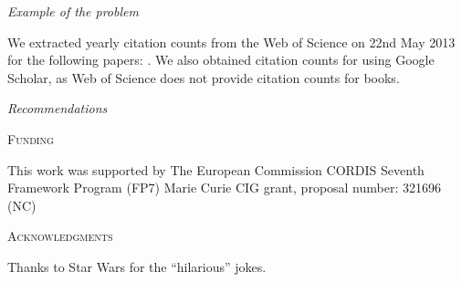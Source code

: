 \documentclass[a4paper,12pt]{article}
\renewcommand{\section}[1]{%
\bigskip
\begin{center}
\begin{Large}
\normalfont\scshape #1
\medskip
\end{Large}
\end{center}}
\renewcommand{\subsection}[1]{%
\bigskip
\begin{center}
\begin{large}
\normalfont\itshape #1
\end{large}
\end{center}}
\begin{document}
\subsection{Example of the problem}

We extracted yearly citation counts from the Web of Science on 22nd May 2013 for the following papers: \citet{diaz1996testing,felsenstein1988phylogenies,felsenstein1985phylogenies,freckleton2000phylogenetic,freckleton2002phylogenetic,freckleton2006detecting,grafen1989phylogenetic,garland1992procedures,hansen1996translating,hansen2005assessing,jones1997optimum,garland2000using,garland1992rate,martins1997phylogenies,price1997correlated,rohle2006comment,ricklefs1996applications,rohlf2001comparative,schluter1997likelihood,westoby1995misinterpreting,westoby1995further}. We also obtained citation counts for \citet{harvey1991comparative} using Google Scholar, as Web of Science does not provide citation counts for books.

\subsection{Recommendations}



\section{Funding}
This work was supported by The European Commission CORDIS Seventh Framework Program (FP7) Marie Curie CIG grant, proposal number: 321696 (NC)

\section{Acknowledgments}
Thanks to Star Wars for the ``hilarious'' jokes.



\end{document}
